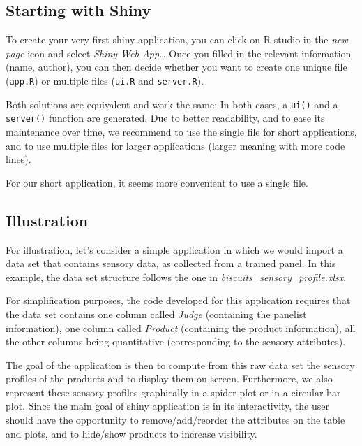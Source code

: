 \documentclass[
]{krantz}
\begin{document}
\hypertarget{starting-with-shiny}{%
\subsection{Starting with Shiny}\label{starting-with-shiny}}

To create your very first shiny application, you can click on R studio in the \emph{new page} icon and select \emph{Shiny Web App\ldots{}}
Once you filled in the relevant information (name, author), you can then decide whether you want to create one unique file (\texttt{app.R}) or multiple files (\texttt{ui.R} and \texttt{server.R}).

Both solutions are equivalent and work the same: In both cases, a \texttt{ui()} and a \texttt{server()} function are generated. Due to better readability, and to ease its maintenance over time, we recommend to use the single file for short applications, and to use multiple files for larger applications (larger meaning with more code lines).

For our short application, it seems more convenient to use a single file.

\hypertarget{illustration}{%
\subsection{Illustration}\label{illustration}}

For illustration, let's consider a simple application in which we would import a data set that contains sensory data, as collected from a trained panel. In this example, the data set structure follows the one in \emph{biscuits\_sensory\_profile.xlsx}.

For simplification purposes, the code developed for this application requires that the data set contains one column called \emph{Judge} (containing the panelist information), one column called \emph{Product} (containing the product information), all the other columns being quantitative (corresponding to the sensory attributes).

The goal of the application is then to compute from this raw data set the sensory profiles of the products and to display them on screen. Furthermore, we also represent these sensory profiles graphically in a spider plot or in a circular bar plot.
Since the main goal of shiny application is in its interactivity, the user should have the opportunity to remove/add/reorder the attributes on the table and plots, and to hide/show products to increase visibility.
\end{document}
